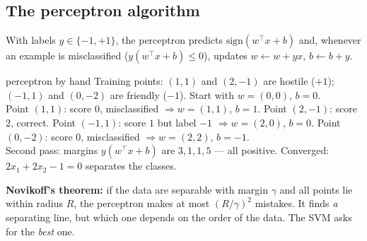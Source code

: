 \documentclass[11pt]{article}
\begin{document}
\subsection{The perceptron algorithm}
With labels $y\in\{-1,+1\}$, the perceptron predicts $\text{sign}(w^\top x+b)$ and, whenever an example is misclassified ($y(w^\top x+b)\le0$), updates $w\leftarrow w+yx$, $b\leftarrow b+y$.
\begin{example}{perceptron by hand}
Training points: $(1,1)$ and $(2,-1)$ are hostile ($+1$); $(-1,1)$ and $(0,-2)$ are friendly ($-1$). Start with $w=(0,0)$, $b=0$.\\
Point $(1,1)$: score 0, misclassified $\Rightarrow w=(1,1)$, $b=1$. Point $(2,-1)$: score $2$, correct. Point $(-1,1)$: score $1$ but label $-1$ $\Rightarrow w=(2,0)$, $b=0$. Point $(0,-2)$: score 0, misclassified $\Rightarrow w=(2,2)$, $b=-1$.\\
Second pass: margins $y(w^\top x+b)$ are $3,1,1,5$ --- all positive. Converged: $2x_1+2x_2-1=0$ separates the classes.
\end{example}
\textbf{Novikoff's theorem:} if the data are separable with margin $\gamma$ and all points lie within radius $R$, the perceptron makes at most $(R/\gamma)^2$ mistakes. It finds \emph{a} separating line, but which one depends on the order of the data. The SVM asks for the \emph{best} one.
\end{document}
